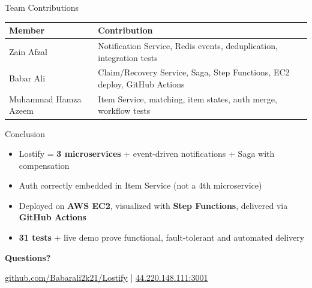 \documentclass[11pt,aspectratio=169]{beamer}
\begin{document}
\begin{frame}{Team Contributions}
  \small
  \begin{tabular}{@{}lp{9.5cm}@{}}
    \toprule
    \textbf{Member} & \textbf{Contribution} \\
    \midrule
    Zain Afzal &
    Notification Service, Redis events, deduplication, integration tests \\[0.3em]
    Babar Ali &
    Claim/Recovery Service, Saga, Step Functions, EC2 deploy, GitHub Actions \\[0.3em]
    Muhammad Hamza Azeem &
    Item Service, matching, item states, auth merge, workflow tests \\
    \bottomrule
  \end{tabular}
\end{frame}

\begin{frame}{Conclusion}
  \begin{itemize}
    \item Lostify = \textbf{3 microservices} + event-driven notifications + Saga with compensation
    \item Auth correctly embedded in Item Service (not a 4th microservice)
    \item Deployed on \textbf{AWS EC2}, visualized with \textbf{Step Functions}, delivered via \textbf{GitHub Actions}
    \item \textbf{31 tests} + live demo prove functional, fault-tolerant and automated delivery
  \end{itemize}
  \vspace{0.6cm}
  \centering
  \Large\textbf{Questions?}
  \vspace{0.3cm}

  \footnotesize
  \href{https://github.com/Babarali2k21/Lostify}{github.com/Babarali2k21/Lostify}
  \quad|\quad
  \href{http://44.220.148.111:3001}{44.220.148.111:3001}
\end{frame}
\end{document}
